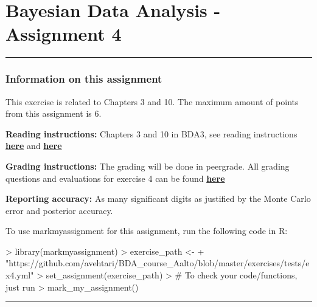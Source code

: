 \documentclass[11pt,a4paper,english]{article}
\newcommand{\HRule}{\rule{\linewidth}{0.5mm}}
\begin{document}


\section*{Bayesian Data Analysis - Assignment 4}



\HRule



\newpage

\subsubsection*{Information on this assignment}

This exercise is related to Chapters 3 and 10. The maximum amount of points from this assignment is 6.


\textbf{Reading instructions:} Chapters 3 and 10 in BDA3, see reading instructions \href{https://github.com/avehtari/BDA_course_Aalto/blob/master/chapter_notes/BDA_notes_ch3.pdf}{\textbf{here}} and \href{https://github.com/avehtari/BDA_course_Aalto/blob/master/chapter_notes/BDA_notes_ch10.pdf}{\textbf{here}}

\textbf{Grading instructions:} The grading will be done in peergrade. All grading questions and evaluations for exercise 4 can be found \href{https://github.com/avehtari/BDA_course_Aalto/blob/master/exercises/ex4_rubric.md}{\textbf{here}}

\textbf{Reporting accuracy:} As many significant digits as justified by the Monte Carlo error and posterior accuracy.

To use markmyassignment for this assignment, run the following code in R:
\begin{Schunk}
\begin{Sinput}
> library(markmyassignment)
> exercise_path <- 
+   "https://github.com/avehtari/BDA_course_Aalto/blob/master/exercises/tests/ex4.yml"
> set_assignment(exercise_path)
> # To check your code/functions, just run
> mark_my_assignment()
\end{Sinput}
\end{Schunk}


\HRule

\newpage
\end{document}
